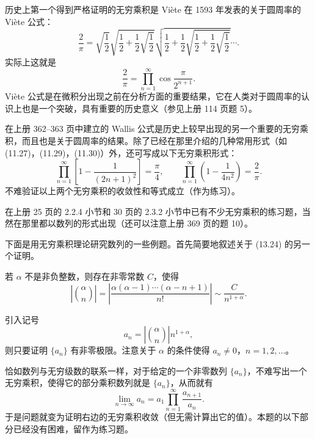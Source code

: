 历史上第一个得到严格证明的无穷乘积是 Viète 在 1593 年发表的关于圆周率的 Viète 公式：
\begin{equation}
\frac2\pi=\sqrt{\frac12}\sqrt{\frac12+\frac12\sqrt{\frac12}}\sqrt{\frac12+\frac12\sqrt{\frac12+\frac12\sqrt{\frac12}}}\cdots.
\tag{13.25}
\end{equation}
实际上这就是
\begin{equation}
\frac2\pi=\prod_{n=1}^{\infty}\cos\frac{\pi}{2^{n+1}}.
\tag{13.26}
\end{equation}
Viète 公式是在微积分出现之前在分析方面的重要结果，它在人类对于圆周率的认识上也是一个突破，具有重要的历史意义（参见上册 114 页题 5）。

在上册 362--363 页中建立的 Wallis 公式是历史上较早出现的另一个重要的无穷乘积，而且也是关于圆周率的结果。除了已经在那里介绍的几种常用形式（如 (11.27)，(11.29)，(11.30)）外，还可写成以下无穷乘积形式：
\begin{equation}
\prod_{n=1}^{\infty}\left[1-\frac1{(2n+1)^2}\right]=\frac\pi4,
\qquad
\prod_{n=1}^{\infty}\left(1-\frac1{4n^2}\right)=\frac2\pi.
\tag{13.27}
\end{equation}
不难验证以上两个无穷乘积的收敛性和等式成立（作为练习）。

在上册 25 页的 2.2.4 小节和 30 页的 2.3.2 小节中已有不少无穷乘积的练习题，当然在那里都以数列的形式出现（还可以注意上册 369 页的题 10）。

下面是用无穷乘积理论研究数列的一些例题。首先简要地叙述关于 (13.24) 的另一个证明。

\begin{xexample}[13.4.1]
若 $\alpha$ 不是非负整数，则存在非零常数 $C$，使得
\[
\left|\binom{\alpha}{n}\right|=\left|\frac{\alpha(\alpha-1)\cdots(\alpha-n+1)}{n!}\right|\sim\frac C{n^{1+\alpha}}.
\]
\end{xexample}
\begin{xproof}
引入记号
\[
a_n=\left|\binom{\alpha}{n}\right|n^{1+\alpha},
\]
则只要证明 $\{a_n\}$ 有非零极限。注意关于 $\alpha$ 的条件使得 $a_n\neq0$，$n=1,2,\ldots$。

恰如数列与无穷级数的联系一样，对于给定的一个非零数列 $\{a_n\}$，不难写出一个无穷乘积，使得它的部分乘积数列就是 $\{a_n\}$，从而就有
\begin{equation}
\lim_{n\to\infty}a_n=a_1\prod_{n=1}^{\infty}\frac{a_{n+1}}{a_n}.
\tag{13.28}
\end{equation}
于是问题就变为证明右边的无穷乘积收敛（但无需计算出它的值）。本题的以下部分已经没有困难，留作为练习题。
\end{xproof}

